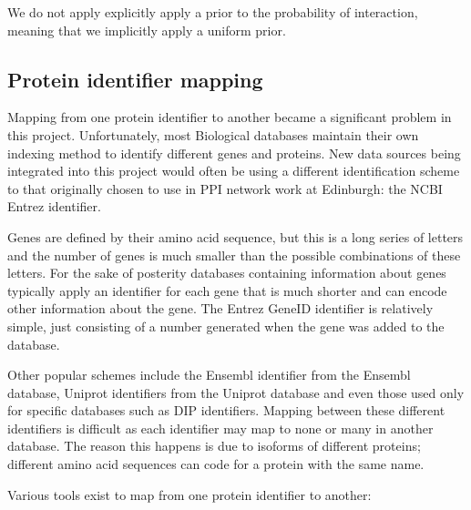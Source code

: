 We do not apply explicitly apply a prior to the probability of interaction, meaning that we implicitly apply a uniform prior.

\subsection{Protein identifier mapping}

Mapping from one protein identifier to another became a significant problem in this project.
Unfortunately, most Biological databases maintain their own indexing method to identify different genes and proteins.
New data sources being integrated into this project would often be using a different identification scheme to that originally chosen to use in PPI network work at Edinburgh: the NCBI Entrez identifier.

Genes are defined by their amino acid sequence, but this is a long series of letters and the number of genes is much smaller than the possible combinations of these letters.
For the sake of posterity databases containing information about genes typically apply an identifier for each gene that is much shorter and can encode other information about the gene.
The Entrez GeneID identifier is relatively simple, just consisting of a number generated when the gene was added to the database\autocite{maglott_entrez_2006}.

Other popular schemes include the Ensembl identifier from the Ensembl database\autocite{ensembl_website}, Uniprot identifiers from the Uniprot database\autocite{uniprot_website} and even those used only for specific databases such as DIP identifiers\autocite{dip_website}.
Mapping between these different identifiers is difficult as each identifier may map to none or many in another database.
The reason this happens is due to isoforms of different proteins; different amino acid sequences can code for a protein with the same name.


Various tools exist to map from one protein identifier to another:

